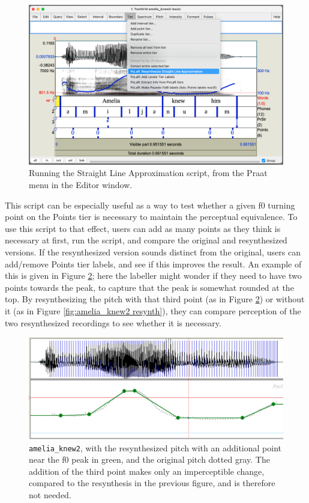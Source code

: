\documentclass[11pt, twoside]{memoir}
\begin{document}
\begin{figure}[H]
\centering
\includegraphics[width=.875\linewidth]{Points-amelia_knew2-before-SLA.png}
\caption{Running the Straight Line Approximation script, from the Praat menu in the Editor window.
\label{fig:amelia_knew2 SLA menu}
}
\end{figure}
This script can be especially useful as a way to test whether a given f0 turning point on the Points tier is necessary to maintain the perceptual equivalence. To use this script to that effect, users can add as many points as they think is necessary at first, run the script, and compare the original and resynthesized versions. If the resynthesized version sounds distinct from the original, users can add\slash remove Points tier labels, and see if this improves the result. An example of this is given in Figure \ref{fig:amelia_knew2 resynth extra}; here the labeller might wonder if they need to have two points towards the peak, to capture that the peak is somewhat rounded at the top. By resynthesizing the pitch with that third point (as in Figure \ref{fig:amelia_knew2 resynth extra}) or without it (as in Figure \ref{fig:amelia_knew2 resynth}), they can compare perception of the two resynthesized recordings to see whether it is necessary.
\begin{figure}[H]
\centering
\includegraphics[width=.875\linewidth]{Points-amelia_knew2-resynth-extra.png}
\caption[\texttt{amelia\_knew2}, with the resynthesized pitch with an additional point.]{\texttt{amelia\_knew2}, with the resynthesized pitch with an additional point near the f0 peak in green, and the original pitch dotted gray. The addition of the third point makes only an imperceptible change, compared to the resynthesis in the previous figure, and is therefore not needed.
\label{fig:amelia_knew2 resynth extra}
}
\end{figure}
\end{document}
